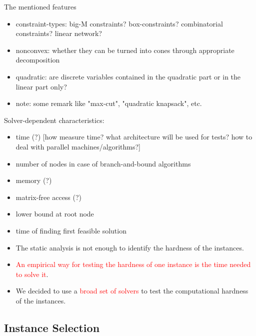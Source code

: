 The mentioned features
\begin{itemize}
\item constraint-types: big-M constraints? box-constraints? combinatorial constraints? linear network?
\item nonconvex: whether they can be turned into cones through appropriate decomposition
\item quadratic: are discrete variables contained in the quadratic part or in the linear part only?
\item note: some remark like "max-cut", "quadratic knapsack", etc.
\end{itemize}





Solver-dependent characteristics:
\begin{itemize}
\item time (?) [how measure time? what architecture will be used for tests? how to deal with parallel machines/algorithms?]
\item number of nodes in case of branch-and-bound algorithms
\item memory (?)
\item matrix-free access (?)
\item lower bound at root node
\item time of finding first feasible solution
\end{itemize}


\begin{itemize}
\item The static analysis is not enough to identify the hardness of the instances.
\item \textcolor{red}{An empirical way for testing the hardness of one instance is the time needed to solve it}.
\item We decided to use a \textcolor{red}{broad set of solvers} to test the computational hardness of the instances.
\end{itemize}




\subsection{Instance Selection}\label{subsec:selection}










